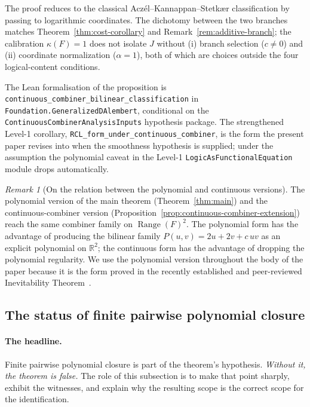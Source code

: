 \documentclass[11pt,a4paper]{article}
\theoremstyle{definition}
\theoremstyle{remark}
\newtheorem{remark}[theorem]{Remark}
\begin{document}
The proof reduces to the classical Acz\'el--Kannappan--Stetk{\ae}r
classification by passing to logarithmic coordinates. The dichotomy
between the two branches matches Theorem~\ref{thm:cost-corollary} and
Remark~\ref{rem:additive-branch}; the calibration $\kappa(F) = 1$ does
not isolate $J$ without (i) branch selection ($c \neq 0$) and (ii)
coordinate normalization ($\alpha = 1$), both of which are choices
outside the four logical-content conditions.

The Lean formalisation of the proposition is
\texttt{continuous\_combiner\_bilinear\_classification} in
\texttt{Foundation.GeneralizedDAlembert}, conditional on the
\texttt{ContinuousCombinerAnalysisInputs} hypothesis package. The
strengthened Level-1 corollary,
\texttt{RCL\_form\_under\_continuous\_combiner}, is the form the
present paper revises into when the smoothness hypothesis is supplied;
under the assumption the polynomial caveat in the Level-1
\texttt{LogicAsFunctionalEquation} module drops automatically.

\begin{remark}[On the relation between the polynomial and continuous
versions]
The polynomial version of the main theorem (Theorem~\ref{thm:main}) and
the continuous-combiner version
(Proposition~\ref{prop:continuous-combiner-extension}) reach the same
combiner family on $\operatorname{Range}(F)^2$. The polynomial form has
the advantage of producing the bilinear family
$P(u, v) = 2u + 2v + c\,uv$ as an explicit polynomial on
$\mathbb{R}^2$; the continuous form has the advantage of dropping the
polynomial regularity. We use the polynomial version throughout the
body of the paper because it is the form proved in the recently
established and peer-reviewed Inevitability
Theorem~\cite{WashburnZlatanovicAllahyarov2026}.
\end{remark}

\subsection{The status of finite pairwise polynomial closure}
\label{subsec:conjecture}

\paragraph{The headline.} Finite pairwise polynomial closure is part
of the theorem's hypothesis. \emph{Without it, the theorem is false.}
The role of this subsection is to make that point sharply, exhibit the
witnesses, and explain why the resulting scope is the correct scope
for the identification.
\end{document}
